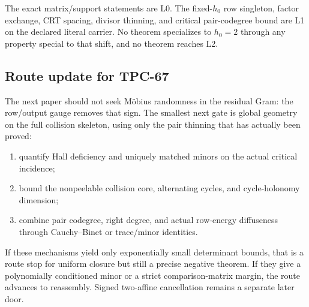 The exact matrix/support statements are L0. The fixed-\(h_0\) row singleton,
factor exchange, CRT spacing, divisor thinning, and critical pair-codegree
bound are L1 on the declared literal carrier. No theorem specializes to
\(h_0=2\) through any property special to that shift, and no theorem reaches
L2.

\subsection{Route update for TPC-67}
The next paper should not seek M\"obius randomness in the residual Gram:
the row/output gauge removes that sign. The smallest next gate is global
geometry on the full collision skeleton, using only the pair thinning that
has actually been proved:
\begin{enumerate}[label=(\roman*)]
\item quantify Hall deficiency and uniquely matched minors on the actual
critical incidence;
\item bound the nonpeelable collision core, alternating cycles, and
cycle-holonomy dimension;
\item combine pair codegree, right degree, and actual row-energy diffuseness
through Cauchy--Binet or trace/minor identities.
\end{enumerate}
If these mechanisms yield only exponentially small determinant bounds, that is
a route stop for uniform closure but still a precise negative theorem. If they
give a polynomially conditioned minor or a strict comparison-matrix margin,
the route advances to reassembly. Signed two-affine cancellation remains a
separate later door.
